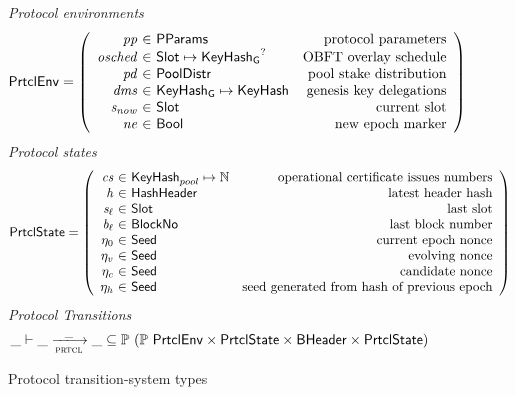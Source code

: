 \begin{figure}
  \emph{Protocol environments}
  \begin{equation*}
    \PrtclEnv =
    \left(
      \begin{array}{r@{~\in~}lr}
        \var{pp} & \PParams & \text{protocol parameters} \\
        \var{osched} & \Slot\mapsto\KeyHashGen^? & \text{OBFT overlay schedule} \\
        \var{pd} & \PoolDistr & \text{pool stake distribution} \\
        \var{dms} & \KeyHashGen\mapsto\KeyHash & \text{genesis key delegations} \\
        \var{s_{now}} & \Slot & \text{current slot} \\
        \var{ne} & \Bool & \text{new epoch marker} \\
      \end{array}
    \right)
  \end{equation*}
  \emph{Protocol states}
  \begin{equation*}
    \PrtclState =
    \left(
      \begin{array}{r@{~\in~}lr}
        \var{cs} & \KeyHash_{pool} \mapsto \N & \text{operational certificate issues numbers} \\
        \var{h} & \HashHeader & \text{latest header hash} \\
        \var{s_\ell} & \Slot & \text{last slot} \\
        \var{b_\ell} & \BlockNo & \text{last block number} \\
        \eta_0 & \Seed & \text{current epoch nonce} \\
        \eta_v & \Seed & \text{evolving nonce} \\
        \eta_c & \Seed & \text{candidate nonce} \\
        \eta_h & \Seed & \text{seed generated from hash of previous epoch} \\
      \end{array}
    \right)
  \end{equation*}
  \emph{Protocol Transitions}
  \begin{equation*}
    \_ \vdash \var{\_} \trans{prtcl}{\_} \var{\_} \subseteq
    \powerset (\powerset{\PrtclEnv} \times \PrtclState \times \BHeader \times \PrtclState)
  \end{equation*}
  \caption{Protocol transition-system types}
  \label{fig:ts-types:prtcl}
\end{figure}

